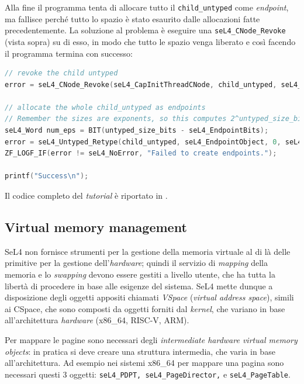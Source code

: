 Alla fine il programma tenta di allocare tutto il \texttt{child\_untyped} come \textit{endpoint}, ma fallisce perché tutto lo spazio è stato esaurito dalle allocazioni fatte precedentemente. La soluzione al problema è eseguire una \texttt{seL4\_CNode\_Revoke} (vista sopra) su di esso, in modo che tutto le spazio venga liberato e così facendo il programma termina con successo:
\begin{lstlisting}[language=C++]
// revoke the child untyped
error = seL4_CNode_Revoke(seL4_CapInitThreadCNode, child_untyped, seL4_WordBits);

// allocate the whole child_untyped as endpoints
// Remember the sizes are exponents, so this computes 2^untyped_size_bits / 2^seL4_EndpointBits:
seL4_Word num_eps = BIT(untyped_size_bits - seL4_EndpointBits);
error = seL4_Untyped_Retype(child_untyped, seL4_EndpointObject, 0, seL4_CapInitThreadCNode, 0, 0, child_tcb, num_eps);
ZF_LOGF_IF(error != seL4_NoError, "Failed to create endpoints.");

printf("Success\n");
\end{lstlisting}
Il codice completo del \textit{tutorial} è riportato in \cite{untyped}.

\subsection{Virtual memory management}
SeL4 non fornisce strumenti per la gestione della memoria virtuale al di là delle primitive per la gestione dell'\textit{hardware}; quindi il servizio di \textit{mapping} della memoria e lo \textit{swapping} devono essere gestiti a livello utente, che ha tutta la libertà di procedere in base alle esigenze del sistema. SeL4 mette dunque a disposizione degli oggetti appositi chiamati \textit{VSpace} (\textit{virtual address space}), simili ai CSpace, che sono composti da oggetti forniti dal \textit{kernel}, che variano in base all'architettura \textit{hardware} (x86\_64, RISC-V, ARM).

Per mappare le pagine sono necessari degli \textit{intermediate hardware virtual memory objects}: in pratica si deve creare una struttura intermedia, che varia in base all'architettura. Ad esempio nei sistemi x86\_64 per mappare una pagina sono necessari questi 3 oggetti: \texttt{seL4\_PDPT, seL4\_PageDirector,} e \texttt{seL4\_PageTable}. 

